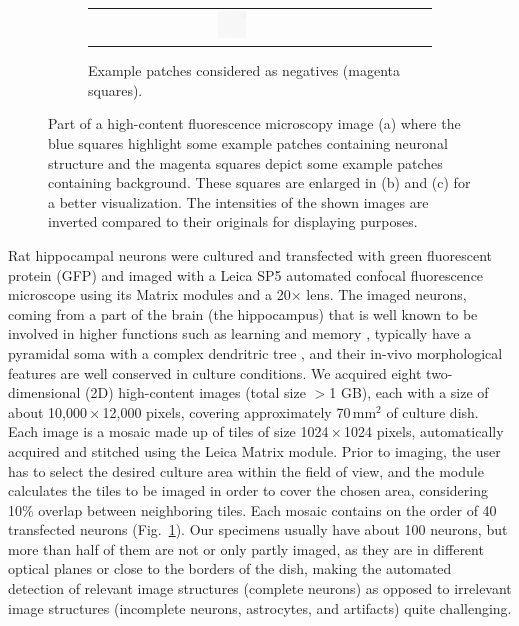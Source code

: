 \begin{figure}
\begin{subfigure}{\textwidth}
\begin{tabular}{c@{\,}c@{\,}c@{\,}c@{\,}c@{}}
				\includegraphics[width=0.1\textwidth]{fig01c15}
			\end{tabular}
			\vspace{-0.5em}
			\caption{Example patches considered as negatives (magenta squares).}
	\end{subfigure}	
	\caption{Part of a high-content fluorescence microscopy image (a) where the blue squares highlight some example patches containing neuronal structure and the magenta squares depict some example patches containing background. These squares are enlarged in (b) and (c) for a better visualization. The intensities of the shown images are inverted compared to their originals for displaying purposes.}
	\label{fig1}%
\end{figure}

Rat hippocampal neurons were cultured and transfected with green fluorescent protein (GFP) and imaged with a Leica SP5 automated confocal fluorescence microscope using its Matrix modules and a 20$\times$ lens. The imaged neurons, coming from a part of the brain (the hippocampus) that is well known to be involved in higher functions such as learning and memory \cite{squire1992memory}, typically have a pyramidal soma with a complex dendritric tree \cite{goslin1998rat}, and their in-vivo morphological features are well conserved in culture conditions. We acquired eight two-dimensional (2D) high-content images (total size $>$1 GB), each with a size of about 10,000\,$\times$\,12,000 pixels, covering approximately 70\,mm${}^2$ of culture dish. Each image is a mosaic made up of tiles of size 1024\,$\times$\,1024 pixels, automatically acquired and stitched using the Leica Matrix module. Prior to imaging, the user has to select the desired culture area within the field of view, and the module calculates the tiles to be imaged in order to cover the chosen area, considering 10\% overlap between neighboring tiles. Each mosaic contains on the order of 40 transfected neurons (Fig.\ \ref{fig1}). Our specimens usually have about 100 neurons, but more than half of them are not or only partly imaged, as they are in different optical planes or close to the borders of the dish, making the automated detection of relevant image structures (complete neurons) as opposed to irrelevant image structures (incomplete neurons, astrocytes, and artifacts) quite challenging.

